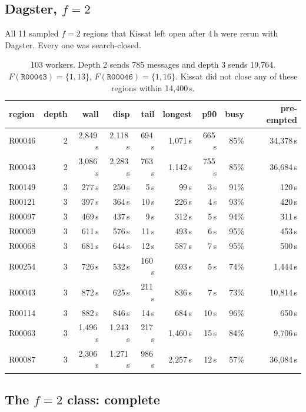 \documentclass[11pt,a4paper,oneside]{report}
\theoremstyle{definition}
\newcommand{\code}[1]{\texttt{#1}}
\begin{document}
\subsection{Dagster, $f=2$}

All 11 sampled $f=2$ regions that Kissat left open after 4\,h were rerun with Dagster.
Every one was search-closed.

\begin{table}[H]
\centering
\small
\begin{tabular}{@{}lrrrrrrrr@{}}
\toprule
region & depth & wall & disp & tail & longest & p90 & busy & pre-empted \\
\midrule
R00046 & 2 & 2{,}849\,s & 2{,}118\,s & 694\,s & 1{,}071\,s & 665\,s & 85\% & 34{,}378\,s \\
R00043 & 2 & 3{,}086\,s & 2{,}283\,s & 763\,s & 1{,}142\,s & 755\,s & 85\% & 36{,}684\,s \\
\midrule
R00149 & 3 & 277\,s & 250\,s & 5\,s & 99\,s & 3\,s & 91\% & 120\,s \\
R00121 & 3 & 397\,s & 364\,s & 10\,s & 226\,s & 4\,s & 93\% & 420\,s \\
R00097 & 3 & 469\,s & 437\,s & 9\,s & 312\,s & 5\,s & 94\% & 311\,s \\
R00069 & 3 & 611\,s & 576\,s & 11\,s & 493\,s & 6\,s & 95\% & 453\,s \\
R00068 & 3 & 681\,s & 644\,s & 12\,s & 587\,s & 7\,s & 95\% & 500\,s \\
R00254 & 3 & 726\,s & 532\,s & 160\,s & 693\,s & 5\,s & 74\% & 1{,}444\,s \\
R00043 & 3 & 872\,s & 625\,s & 211\,s & 836\,s & 7\,s & 73\% & 10{,}814\,s \\
R00114 & 3 & 882\,s & 846\,s & 14\,s & 684\,s & 10\,s & 96\% & 650\,s \\
R00063 & 3 & 1{,}496\,s & 1{,}243\,s & 217\,s & 1{,}460\,s & 15\,s & 84\% & 9{,}706\,s \\
R00087 & 3 & 2{,}306\,s & 1{,}271\,s & 986\,s & 2{,}257\,s & 12\,s & 57\% & 36{,}084\,s \\
\bottomrule
\end{tabular}
\caption{103 workers. Depth 2 sends 785 messages and depth 3 sends 19{,}764.
$F(\code{R00043})=\{1,13\}$, $F(\code{R00046})=\{1,16\}$. Kissat did not close any of these
regions within 14{,}400\,s.}
\label{p8-tab:f2}
\end{table}
\subsection{The $f=2$ class: complete}\label{p8-sec:f2done}
\end{document}
